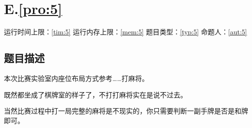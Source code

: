 \documentclass[
	lang=cn,
	color=green
]{elegantbook}
\begin{document}
\newpage
\chapter*{E.\quad \ref*{pro:5}}
\begin{center}
    运行时间上限：\ref*{tim:5} \quad 运行内存上限：\ref*{mem:5} \quad 题目类型：\ref*{typ:5} \quad 命题人：\ref*{aut:5}
\end{center}

\section*{题目描述}
本次比赛实验室内座位布局方式参考……打麻将。

既然都坐成了棋牌室的样子了，不打打麻将实在是说不过去。

当然比赛过程中打一局完整的麻将是不现实的，你只需要判断一副手牌是否是和牌即可。
\end{document}
